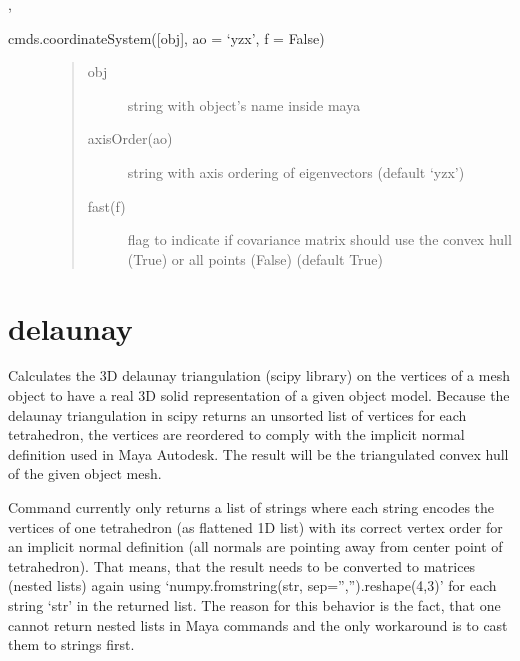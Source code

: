 \documentclass[letterpaper,10pt,english]{sphinxmanual}
\begin{document}
 {\hyperref[\detokenize{pk_src.normalize:normalize}]{}}, {\hyperref[\detokenize{pk_src.exportData:exportdata}]{}}

 cmds.coordinateSystem({[}obj{]}, ao = ‘yzx’, f = False)
\begin{description}
\item[{}] \leavevmode\begin{quote}\begin{description}
\item[{obj}] \leavevmode
string with object’s name inside maya

\item[{axisOrder(ao)}] \leavevmode
string with axis ordering of eigenvectors (default ‘yzx’)

\item[{fast(f)}] \leavevmode
flag to indicate if covariance matrix should use the convex hull (True) or all points (False) (default True)

\end{description}\end{quote}

\end{description}


\section{delaunay}
\label{\detokenize{pk_src.delaunay:delaunay}}\label{\detokenize{pk_src.delaunay::doc}}\label{\detokenize{pk_src.delaunay:id1}}
{\hyperref[\detokenize{index:commands}]{}}
\label{\detokenize{pk_src.delaunay:module-pk_src.delaunay}}
Calculates the 3D delaunay triangulation (scipy library) on the vertices of a mesh object to have a real 3D solid representation of a given object model. Because the delaunay triangulation in scipy returns an unsorted list of vertices for each tetrahedron, the vertices are reordered to comply with the implicit normal definition used in Maya Autodesk. The result will be the triangulated convex hull of the given object mesh.

Command currently only returns a list of strings where each string encodes the vertices of one tetrahedron (as flattened 1D list) with its correct vertex order for an implicit normal definition (all normals are pointing away from center point of tetrahedron). That means, that the result needs to be converted to matrices (nested lists) again using ‘numpy.fromstring(str, sep=”,”).reshape(4,3)’ for each string ‘str’ in the returned list. The reason for this behavior is the fact, that one cannot return nested lists in Maya commands and the only workaround is to cast them to strings first.
\end{document}
